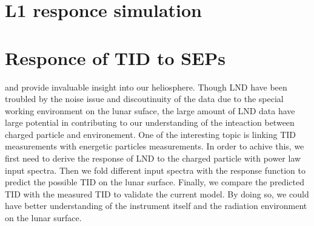 \section{L1 responce simulation}


\section{Responce of TID to SEPs}
and provide invaluable insight into our heliosphere. 
Though \ac{LND} have been troubled by the noise issue and discoutinuity of the data due to the special working environment on the lunar suface, the large amount of \ac{LND} data have large potential in contributing to our understanding of the inteaction between charged particle and environement. One of the interesting topic is linking \ac{TID} measurements with energetic particles measurements. In order to achive this, we first need to derive the response of \ac{LND} to the charged particle with power law input spectra. Then we fold different input spectra with the response function to predict the possible \ac{TID} on the lunar surface. Finally, we compare the predicted \ac{TID} with the measured \ac{TID} to validate the current model. By doing so, we could have better understanding of the instrument itself and the radiation environment on the lunar surface.
